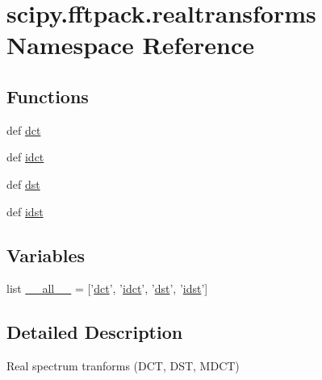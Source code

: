 \hypertarget{namespacescipy_1_1fftpack_1_1realtransforms}{}\section{scipy.\+fftpack.\+realtransforms Namespace Reference}
\label{namespacescipy_1_1fftpack_1_1realtransforms}
\subsection*{Functions}
\begin{DoxyCompactItemize}
\item 
def \hyperlink{namespacescipy_1_1fftpack_1_1realtransforms_a76672c2a5542cad3c7bafb9214207888}{dct}
\item 
def \hyperlink{namespacescipy_1_1fftpack_1_1realtransforms_a90f8de358ca45ab64b0810b4160402c9}{idct}
\item 
def \hyperlink{namespacescipy_1_1fftpack_1_1realtransforms_a4b625068c8ca210c932d6d260e093b3e}{dst}
\item 
def \hyperlink{namespacescipy_1_1fftpack_1_1realtransforms_acc0ae30a12dec902a76522a5f01ce1ed}{idst}
\end{DoxyCompactItemize}
\subsection*{Variables}
\begin{DoxyCompactItemize}
\item 
list \hyperlink{namespacescipy_1_1fftpack_1_1realtransforms_aa4bca32192554733abe6d839cc8cfa5e}{\+\_\+\+\_\+all\+\_\+\+\_\+} = \mbox{[}'\hyperlink{namespacescipy_1_1fftpack_1_1realtransforms_a76672c2a5542cad3c7bafb9214207888}{dct}', '\hyperlink{namespacescipy_1_1fftpack_1_1realtransforms_a90f8de358ca45ab64b0810b4160402c9}{idct}', '\hyperlink{namespacescipy_1_1fftpack_1_1realtransforms_a4b625068c8ca210c932d6d260e093b3e}{dst}', '\hyperlink{namespacescipy_1_1fftpack_1_1realtransforms_acc0ae30a12dec902a76522a5f01ce1ed}{idst}'\mbox{]}
\end{DoxyCompactItemize}


\subsection{Detailed Description}
\begin{DoxyVerb}Real spectrum tranforms (DCT, DST, MDCT)
\end{DoxyVerb}
 

